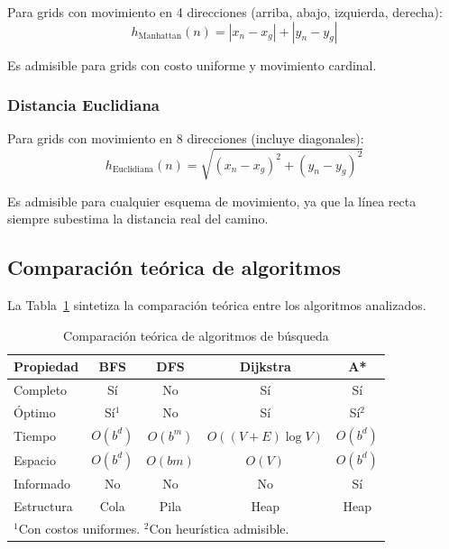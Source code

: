 Para grids con movimiento en 4 direcciones (arriba, abajo, izquierda, derecha):
\begin{equation}
    h_{\text{Manhattan}}(n) = |x_n - x_g| + |y_n - y_g|
    \label{eq:manhattan}
\end{equation}

Es admisible para grids con costo uniforme y movimiento cardinal.

\subsubsection{Distancia Euclidiana}

Para grids con movimiento en 8 direcciones (incluye diagonales):
\begin{equation}
    h_{\text{Euclidiana}}(n) = \sqrt{(x_n - x_g)^2 + (y_n - y_g)^2}
    \label{eq:euclidean}
\end{equation}

Es admisible para cualquier esquema de movimiento, ya que la línea recta siempre subestima la distancia real del camino.

\subsection{Comparación teórica de algoritmos}

La Tabla~\ref{tab:comparison} sintetiza la comparación teórica entre los algoritmos analizados.

\begin{table}[H]
\centering
\caption{Comparación teórica de algoritmos de búsqueda}
\label{tab:comparison}
\renewcommand{\arraystretch}{1.3}
\begin{tabular}{@{}lcccc@{}}
\toprule
\textbf{Propiedad} & \textbf{BFS} & \textbf{DFS} & \textbf{Dijkstra} & \textbf{A*} \\
\midrule
Completo & Sí & No & Sí & Sí \\
Óptimo & Sí$^1$ & No & Sí & Sí$^2$ \\
Tiempo & $O(b^d)$ & $O(b^m)$ & $O((V\!+\!E)\log V)$ & $O(b^d)$ \\
Espacio & $O(b^d)$ & $O(bm)$ & $O(V)$ & $O(b^d)$ \\
Informado & No & No & No & Sí \\
Estructura & Cola & Pila & Heap & Heap \\
\bottomrule
\multicolumn{5}{l}{\footnotesize $^1$Con costos uniformes. $^2$Con heurística admisible.}
\end{tabular}
\end{table}
